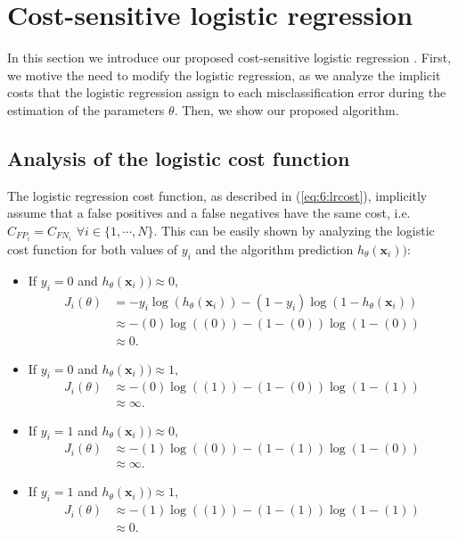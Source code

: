\section{Cost-sensitive logistic regression}
\label{sec:6:cslr}

In this section we introduce our proposed cost-sensitive logistic regression 
\citep{CorreaBahnsen2014b}. First, we motive the need to modify the logistic regression, as we 
analyze the implicit costs that the logistic regression assign to each misclassification error 
during the estimation of the parameters $\theta$. Then, we show our proposed algorithm.


\subsection{Analysis of the logistic cost function}
\label{sec:6:log_cost_analysis}

The logistic regression cost function, as described in (\ref{eq:6:lrcost}), implicitly assume that 
a false positives and a false negatives have the same cost, i.e. $C_{{FP}_i} = C_{{FN}_i}$ $\forall 
i \in \{1,\cdots,N\}$. This can be easily shown by analyzing the logistic cost function for both 
values of $y_i$ and the algorithm prediction $h_\theta(\mathbf{x}_i))$:

\begin{itemize}
\item If $y_i=0$ and $h_\theta(\mathbf{x}_i)) \approx 0$, 
\begin{align*}
 J_i(\theta) &= -y_i\log(h_\theta(\mathbf{x}_i)) -(1-y_i)\log(1-h_\theta(\mathbf{x}_i)) \nonumber \\
 &\approx -(0)\log((0)) -(1-(0))\log(1-(0)) \nonumber \\
 &\approx 0.
\end{align*}

\item If $y_i=0$ and $h_\theta(\mathbf{x}_i)) \approx 1$, 
\begin{align*}
 J_i(\theta) &\approx -(0)\log((1)) -(1-(0))\log(1-(1)) \nonumber \\
 &\approx \infty.
\end{align*}

\item If $y_i=1$ and $h_\theta(\mathbf{x}_i)) \approx 0$, 
\begin{align*}
 J_i(\theta) &\approx -(1)\log((0)) -(1-(1))\log(1-(0)) \nonumber \\
 &\approx \infty.
\end{align*}

\item If $y_i=1$ and $h_\theta(\mathbf{x}_i)) \approx 1$, 
\begin{align*}
 J_i(\theta) &\approx -(1)\log((1)) -(1-(1))\log(1-(1)) \nonumber \\
 &\approx 0.
\end{align*}
\end{itemize}

